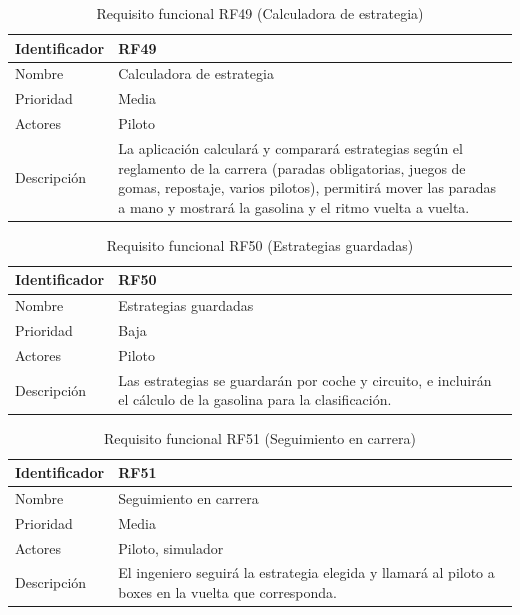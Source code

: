 \begin{table}[H]
	\centering
	\renewcommand{\arraystretch}{2}
	\begin{tabular}{|l|p{10cm}|}
		\hline
		Identificador & RF49 \\
		\hline
		Nombre & Calculadora de estrategia \\
		\hline
		Prioridad & Media \\
		\hline
		Actores & Piloto \\
		\hline
		Descripción & La aplicación calculará y comparará estrategias según el reglamento de la carrera (paradas obligatorias, juegos de gomas, repostaje, varios pilotos), permitirá mover las paradas a mano y mostrará la gasolina y el ritmo vuelta a vuelta. \\
		\hline
	\end{tabular}
	\caption{Requisito funcional RF49 (Calculadora de estrategia)}
	\label{tab:rf49}
\end{table}

\begin{table}[H]
	\centering
	\renewcommand{\arraystretch}{2}
	\begin{tabular}{|l|p{10cm}|}
		\hline
		Identificador & RF50 \\
		\hline
		Nombre & Estrategias guardadas \\
		\hline
		Prioridad & Baja \\
		\hline
		Actores & Piloto \\
		\hline
		Descripción & Las estrategias se guardarán por coche y circuito, e incluirán el cálculo de la gasolina para la clasificación. \\
		\hline
	\end{tabular}
	\caption{Requisito funcional RF50 (Estrategias guardadas)}
	\label{tab:rf50}
\end{table}

\begin{table}[H]
	\centering
	\renewcommand{\arraystretch}{2}
	\begin{tabular}{|l|p{10cm}|}
		\hline
		Identificador & RF51 \\
		\hline
		Nombre & Seguimiento en carrera \\
		\hline
		Prioridad & Media \\
		\hline
		Actores & Piloto, simulador \\
		\hline
		Descripción & El ingeniero seguirá la estrategia elegida y llamará al piloto a boxes en la vuelta que corresponda. \\
		\hline
	\end{tabular}
	\caption{Requisito funcional RF51 (Seguimiento en carrera)}
	\label{tab:rf51}
\end{table}

